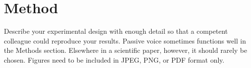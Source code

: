 \section{Method}
\label{sec:method}

Describe your experimental design with enough detail so that a competent colleague could reproduce your results. Passive voice sometimes functions well in the Methods section.
Elsewhere in a scientific paper, however, it should rarely be chosen. Figures need to be included in JPEG, PNG, or PDF format only.
